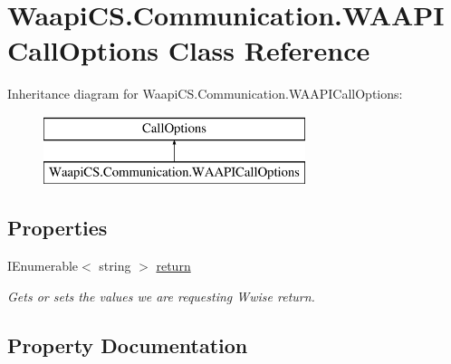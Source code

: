 \hypertarget{class_waapi_c_s_1_1_communication_1_1_w_a_a_p_i_call_options}{}\section{Waapi\+C\+S.\+Communication.\+W\+A\+A\+P\+I\+Call\+Options Class Reference}
\label{class_waapi_c_s_1_1_communication_1_1_w_a_a_p_i_call_options}
Inheritance diagram for Waapi\+C\+S.\+Communication.\+W\+A\+A\+P\+I\+Call\+Options\+:\begin{figure}[H]
\begin{center}
\leavevmode
\includegraphics[height=2.000000cm]{class_waapi_c_s_1_1_communication_1_1_w_a_a_p_i_call_options}
\end{center}
\end{figure}
\subsection*{Properties}
\begin{DoxyCompactItemize}
\item 
I\+Enumerable$<$ string $>$ \mbox{\hyperlink{class_waapi_c_s_1_1_communication_1_1_w_a_a_p_i_call_options_a0ef1a18dabcfbe540c37ffab37e364ad}{return}}
\begin{DoxyCompactList}\small\item\em Gets or sets the values we are requesting Wwise return. \end{DoxyCompactList}\end{DoxyCompactItemize}


\subsection{Property Documentation}
\mbox{\label{class_waapi_c_s_1_1_communication_1_1_w_a_a_p_i_call_options_a0ef1a18dabcfbe540c37ffab37e364ad}} 
